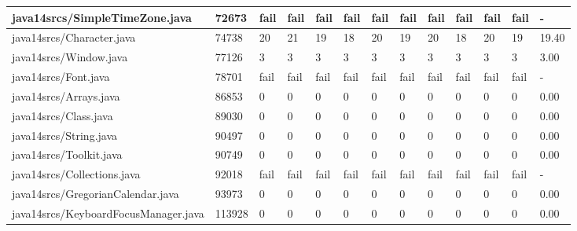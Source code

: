 \begin{tabular}{|l|l|l|l|l|l|l|l|l|l|l|l|l|}
\hline
java14srcs/SimpleTimeZone.java                     & 72673       & fail      & fail      & fail      & fail      & fail      & fail      & fail      & fail      & fail      & fail      & -         \\
\hline
java14srcs/Character.java                          & 74738       & 20        & 21        & 19        & 18        & 20        & 19        & 20        & 18        & 20        & 19        & 19.40     \\
\hline
java14srcs/Window.java                             & 77126       & 3         & 3         & 3         & 3         & 3         & 3         & 3         & 3         & 3         & 3         & 3.00      \\
\hline
java14srcs/Font.java                               & 78701       & fail      & fail      & fail      & fail      & fail      & fail      & fail      & fail      & fail      & fail      & -         \\
\hline
java14srcs/Arrays.java                             & 86853       & 0         & 0         & 0         & 0         & 0         & 0         & 0         & 0         & 0         & 0         & 0.00      \\
\hline
java14srcs/Class.java                              & 89030       & 0         & 0         & 0         & 0         & 0         & 0         & 0         & 0         & 0         & 0         & 0.00      \\
\hline
java14srcs/String.java                             & 90497       & 0         & 0         & 0         & 0         & 0         & 0         & 0         & 0         & 0         & 0         & 0.00      \\
\hline
java14srcs/Toolkit.java                            & 90749       & 0         & 0         & 0         & 0         & 0         & 0         & 0         & 0         & 0         & 0         & 0.00      \\
\hline
java14srcs/Collections.java                        & 92018       & fail      & fail      & fail      & fail      & fail      & fail      & fail      & fail      & fail      & fail      & -         \\
\hline
java14srcs/GregorianCalendar.java                  & 93973       & 0         & 0         & 0         & 0         & 0         & 0         & 0         & 0         & 0         & 0         & 0.00      \\
\hline
java14srcs/KeyboardFocusManager.java               & 113928      & 0         & 0         & 0         & 0         & 0         & 0         & 0         & 0         & 0         & 0         & 0.00      \\

\end{tabular}
